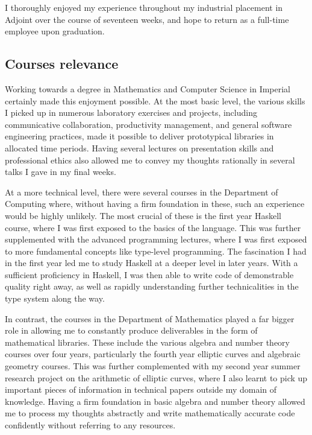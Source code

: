 \documentclass[11pt]{article}
\begin{document}
I thoroughly enjoyed my experience throughout my industrial placement in Adjoint over the course of seventeen weeks, and hope to return as a full-time employee upon graduation.

\subsection{Courses relevance}

Working towards a degree in Mathematics and Computer Science in Imperial certainly made this enjoyment possible. At the most basic level, the various skills I picked up in numerous laboratory exercises and projects, including communicative collaboration, productivity management, and general software engineering practices, made it possible to deliver prototypical libraries in allocated time periods. Having several lectures on presentation skills and professional ethics also allowed me to convey my thoughts rationally in several talks I gave in my final weeks.

At a more technical level, there were several courses in the Department of Computing where, without having a firm foundation in these, such an experience would be highly unlikely. The most crucial of these is the first year Haskell course, where I was first exposed to the basics of the language. This was further supplemented with the advanced programming lectures, where I was first exposed to more fundamental concepts like type-level programming. The fascination I had in the first year led me to study Haskell at a deeper level in later years. With a sufficient proficiency in Haskell, I was then able to write code of demonstrable quality right away, as well as rapidly understanding further technicalities in the type system along the way.

In contrast, the courses in the Department of Mathematics played a far bigger role in allowing me to constantly produce deliverables in the form of mathematical libraries. These include the various algebra and number theory courses over four years, particularly the fourth year elliptic curves and algebraic geometry courses. This was further complemented with my second year summer research project on the arithmetic of elliptic curves, where I also learnt to pick up important pieces of information in technical papers outside my domain of knowledge. Having a firm foundation in basic algebra and number theory allowed me to process my thoughts abstractly and write mathematically accurate code confidently without referring to any resources.
\end{document}
